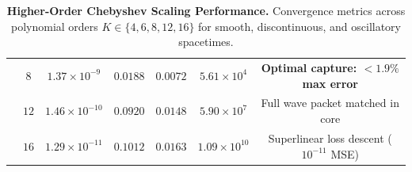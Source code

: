 \documentclass[11pt,a4paper]{article}
\begin{document}
\begin{table}[h!]
{\begin{tabular}{lcccccc}
                         & $8$  & $1.37 \times 10^{-9}$  & $0.0188$ & $0.0072$ & $5.61 \times 10^4$ & \textbf{Optimal capture: $< 1.9\%$ max error} \\
                         & $12$ & $1.46 \times 10^{-10}$ & $0.0920$ & $0.0148$ & $5.90 \times 10^7$ & Full wave packet matched in core \\
                         & $16$ & $1.29 \times 10^{-11}$ & $0.1012$ & $0.0163$ & $1.09 \times 10^{10}$ & Superlinear loss descent ($10^{-11}$ MSE) \\
\bottomrule
\end{tabular}
}
\caption{\textbf{Higher-Order Chebyshev Scaling Performance.} Convergence metrics across polynomial orders $K \in \{4, 6, 8, 12, 16\}$ for smooth, discontinuous, and oscillatory spacetimes.}
\label{tab:k_scaling}
\end{table}
\end{document}
